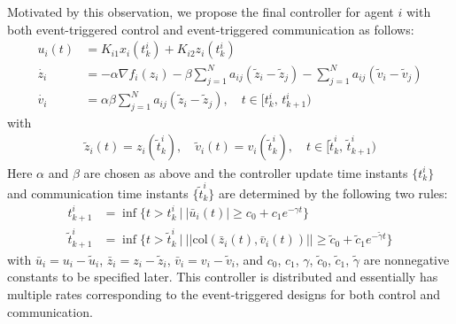 \documentclass[sort&compress]{IEEEtran}
\begin{document}
Motivated by this observation, we propose the final controller for agent $i$ with both event-triggered control and event-triggered communication as follows: 
\begin{align}\label{ctr:event-control-comm}
	u_i(t)&=K_{i1} x_i(t^i_k)+K_{i2} z_i(t^i_k)\nonumber\\
	\dot{z_i}&= -\alpha \nabla f_i(z_i)-\beta \sum_{j=1}^{N}a_{ij}(\tilde z_i- \tilde z_j)-\sum_{j=1}^{N} a_{ij}(\tilde v_i-\tilde v_j) \nonumber \\
	\dot{v_i} &=\alpha \beta \sum_{j=1}^{N}a_{ij}(\tilde z_i-\tilde z_j),\quad t\in [t^i_k,\,t^i_{k+1})  
\end{align}
with 
\begin{align*}%
	\tilde{z}_i(t)=z_i(\tilde t_k^i),\quad \tilde{v}_i(t)=v_i(\tilde t_k^i),\quad t\in[\tilde t_k^i,\,\tilde t_{k+1}^{i})
\end{align*}
Here $\alpha$ and $\beta$ are chosen as above and the controller update time instants $\{t^i_{k}\}$ and communication time instants $\{\tilde t_{k}^i\}$ are determined by the following two rules: 
\begin{align} 
	t^i_{k+1}&=\inf\{t>t^i_k ~\big|~|\bar  u_i(t)|\geq c_0+c_1 e^{-\gamma t} \}\label{ctr:trigger-condition-ctr}\\
	\tilde t_{k+1}^{i}&=\inf \{ t>\tilde t_{k}^{i}~\big|~||\mbox{col}(\bar {z}_i(t),\bar{v}_i(t))|| \geq \tilde c_0+\tilde c_{1}e^{- \tilde \gamma t} \} \label{ctr:trigger-condition-comm}
\end{align}
with $\bar u_i=u_i-\tilde u_i$, $\bar z_i=z_i-\tilde z_i$, $\bar v_i=v_i-  \tilde{v}_i$, and  $c_0$, $c_1$, $\gamma$, $\tilde c_0$, $\tilde c_1$, $\tilde \gamma$ are nonnegative constants to be specified later.  This controller is distributed and essentially has multiple rates corresponding to  the event-triggered designs for both control and communication. 

\end{document}
